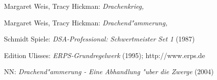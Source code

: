 \begin{thebibliography}{99}
Margaret Weis, Tracy Hickman: \textit{Drachenkrieg,}

Margaret Weis, Tracy Hickman: \textit{Drachend"ammerung,}

Schmidt Spiele: \textit{DSA-Professional: Schwertmeister Set 1} (1987)

Edition Ulisses: \textit{ERPS-Grundregelwerk} (1995); http://www.erps.de

NN: \textit{Drachend"ammerung - Eine Abhandlung "uber die Zwerge} (2004)

\end{thebibliography}
